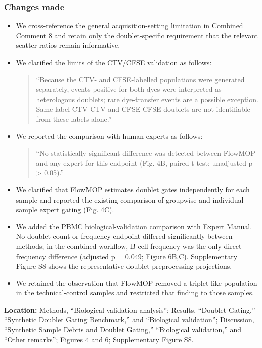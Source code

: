 \documentclass[
  11pt,
  a4paper,
]{article}
\begin{document}
\subsubsection{Changes made}\label{changes-made-10}

\begin{itemize}
\item
  We cross-reference the general acquisition-setting limitation in
  Combined Comment 8 and retain only the doublet-specific requirement
  that the relevant scatter ratios remain informative.
\item
  We clarified the limits of the CTV/CFSE validation as follows:

  \begin{quote}
  ``Because the CTV- and CFSE-labelled populations were generated
  separately, events positive for both dyes were interpreted as
  heterologous doublets; rare dye-transfer events are a possible
  exception. Same-label CTV-CTV and CFSE-CFSE doublets are not
  identifiable from these labels alone.''
  \end{quote}
\item
  We reported the comparison with human experts as follows:

  \begin{quote}
  ``No statistically significant difference was detected between FlowMOP
  and any expert for this endpoint (Fig. 4B, paired t-test; unadjusted p
  \textgreater{} 0.05).''
  \end{quote}
\item
  We clarified that FlowMOP estimates doublet gates independently for
  each sample and reported the existing comparison of groupwise and
  individual-sample expert gating (Fig. 4C).
\item
  We added the PBMC biological-validation comparison with Expert Manual.
  No doublet count or frequency endpoint differed significantly between
  methods; in the combined workflow, B-cell frequency was the only
  direct frequency difference (adjusted p = 0.049; Figure 6B,C).
  Supplementary Figure S8 shows the representative doublet preprocessing
  projections.
\item
  We retained the observation that FlowMOP removed a triplet-like
  population in the technical-control samples and restricted that
  finding to those samples.
\end{itemize}

\textbf{Location:} Methods, ``Biological-validation analysis''; Results,
``Doublet Gating,'' ``Synthetic Doublet Gating Benchmark,'' and
``Biological validation''; Discussion, ``Synthetic Sample Debris and
Doublet Gating,'' ``Biological validation,'' and ``Other remarks'';
Figures 4 and 6; Supplementary Figure S8.
\end{document}
